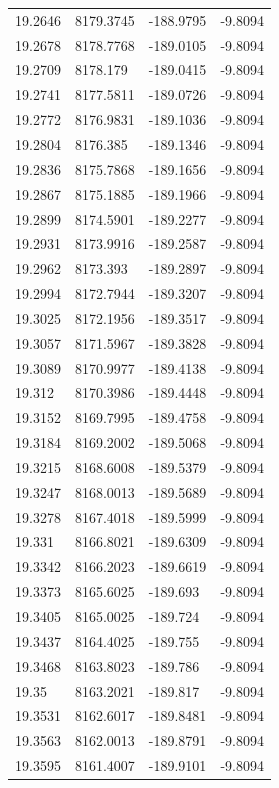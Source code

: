 \begin{table}[H]
\begin{tabular}{llll}
19.2646 & 8179.3745 & -188.9795 & -9.8094 \\
19.2678 & 8178.7768 & -189.0105 & -9.8094 \\
19.2709 & 8178.179 & -189.0415 & -9.8094 \\
19.2741 & 8177.5811 & -189.0726 & -9.8094 \\
19.2772 & 8176.9831 & -189.1036 & -9.8094 \\
19.2804 & 8176.385 & -189.1346 & -9.8094 \\
19.2836 & 8175.7868 & -189.1656 & -9.8094 \\
19.2867 & 8175.1885 & -189.1966 & -9.8094 \\
19.2899 & 8174.5901 & -189.2277 & -9.8094 \\
19.2931 & 8173.9916 & -189.2587 & -9.8094 \\
19.2962 & 8173.393 & -189.2897 & -9.8094 \\
19.2994 & 8172.7944 & -189.3207 & -9.8094 \\
19.3025 & 8172.1956 & -189.3517 & -9.8094 \\
19.3057 & 8171.5967 & -189.3828 & -9.8094 \\
19.3089 & 8170.9977 & -189.4138 & -9.8094 \\
19.312 & 8170.3986 & -189.4448 & -9.8094 \\
19.3152 & 8169.7995 & -189.4758 & -9.8094 \\
19.3184 & 8169.2002 & -189.5068 & -9.8094 \\
19.3215 & 8168.6008 & -189.5379 & -9.8094 \\
19.3247 & 8168.0013 & -189.5689 & -9.8094 \\
19.3278 & 8167.4018 & -189.5999 & -9.8094 \\
19.331 & 8166.8021 & -189.6309 & -9.8094 \\
19.3342 & 8166.2023 & -189.6619 & -9.8094 \\
19.3373 & 8165.6025 & -189.693 & -9.8094 \\
19.3405 & 8165.0025 & -189.724 & -9.8094 \\
19.3437 & 8164.4025 & -189.755 & -9.8094 \\
19.3468 & 8163.8023 & -189.786 & -9.8094 \\
19.35 & 8163.2021 & -189.817 & -9.8094 \\
19.3531 & 8162.6017 & -189.8481 & -9.8094 \\
19.3563 & 8162.0013 & -189.8791 & -9.8094 \\
19.3595 & 8161.4007 & -189.9101 & -9.8094 \\

\end{tabular}
\end{table}
